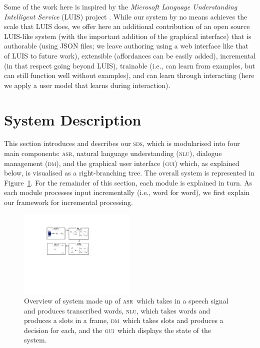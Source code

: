 \documentclass[11pt]{article}
\newcommand{\sds}[0]{\textsc{sds}}
\newcommand{\nlu}[0]{\textsc{nlu}}
\newcommand{\asr}[0]{\textsc{asr}}
\newcommand{\dm}[0]{\textsc{dm}}
\newcommand{\ui}[0]{\textsc{gui}}
\begin{document}
Some of the work here is inspired by the \emph{Microsoft Language Understanding Intelligent Service} (LUIS) project \cite{Williams2015_sigdial}. While our system by no means achieves the scale that LUIS does, we offer here an additional contribution of an open source LUIS-like system (with the important addition of the graphical interface) that is authorable (using JSON files; we leave authoring using a web interface like that of LUIS to future work), extensible (affordances can be easily added), incremental (in that respect going beyond LUIS), trainable (i.e., can learn from examples, but can still function well without examples), and can learn through interacting (here we apply a user model that learns during interaction). 

\section{System Description}
\label{section:system_def}

This section introduces and describes our \sds, which is modularised into four main components: \asr, natural language understanding (\nlu), dialogue management (\dm), and the graphical user interface (\ui) which, as explained below, is visualised as a right-branching tree. The overall system is represented in Figure~\ref{fig:overview}. For the remainder of this section, each module is explained in turn. As each module processes input incrementally (i.e., word for word), we first explain our framework for incremental processing.

\begin{figure}[ht]
  \centering
      \includegraphics[width=0.5\textwidth]{figures/sig16-overview.pdf}	
      \caption{Overview of system made up of \asr\ which takes in a speech signal and produces transcribed words, \nlu, which takes words and produces a slots in a frame, \dm\ which takes slots and produces a decision for each, and the \ui\ which displays the state of the system. \label{fig:overview}}
\end{figure}
\end{document}
